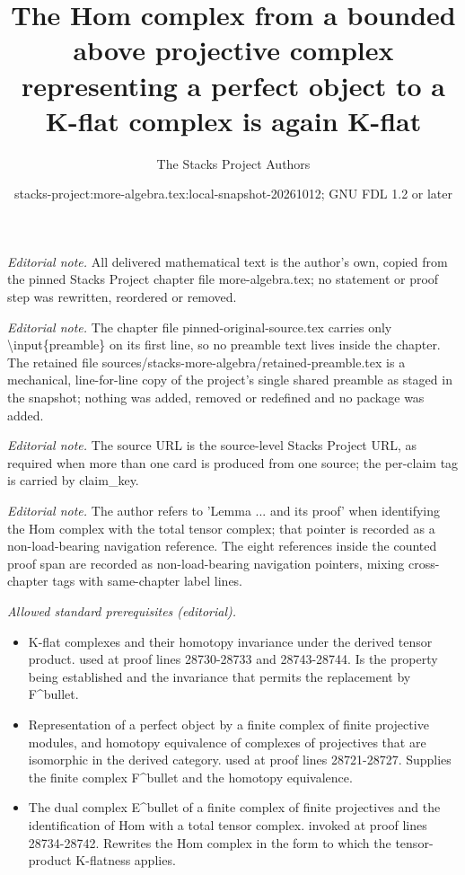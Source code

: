 \documentclass[10pt,a4paper]{amsart}
\title{The Hom complex from a bounded above projective complex representing a perfect object to a K-flat complex is again K-flat}
\author{The Stacks Project Authors}
\date{stacks-project:more-algebra.tex:local-snapshot-20261012; GNU FDL 1.2 or later}
\theoremstyle{plain}
\theoremstyle{definition}
\theoremstyle{remark}
\numberwithin{equation}{subsection}
\begin{document}
\maketitle
\setcounter{subsection}{1}
\noindent\textit{Editorial note.} All delivered mathematical text is the author's own, copied from the pinned Stacks Project chapter file more-algebra.tex; no statement or proof step was rewritten, reordered or removed.\par\medskip
\noindent\textit{Editorial note.} The chapter file pinned-original-source.tex carries only \textbackslash{}input\{preamble\} on its first line, so no preamble text lives inside the chapter. The retained file sources/stacks-more-algebra/retained-preamble.tex is a mechanical, line-for-line copy of the project's single shared preamble as staged in the snapshot; nothing was added, removed or redefined and no package was added.\par\medskip
\noindent\textit{Editorial note.} The source URL is the source-level Stacks Project URL, as required when more than one card is produced from one source; the per-claim tag is carried by claim\_key.\par\medskip
\noindent\textit{Editorial note.} The author refers to 'Lemma ... and its proof' when identifying the Hom complex with the total tensor complex; that pointer is recorded as a non-load-bearing navigation reference. The eight references inside the counted proof span are recorded as non-load-bearing navigation pointers, mixing cross-chapter tags with same-chapter label lines.\par\medskip
\noindent\textit{Allowed standard prerequisites (editorial).}\begin{itemize}
\item K-flat complexes and their homotopy invariance under the derived tensor product. used at proof lines 28730-28733 and 28743-28744. Is the property being established and the invariance that permits the replacement by F\textasciicircum{}bullet.
\item Representation of a perfect object by a finite complex of finite projective modules, and homotopy equivalence of complexes of projectives that are isomorphic in the derived category. used at proof lines 28721-28727. Supplies the finite complex F\textasciicircum{}bullet and the homotopy equivalence.
\item The dual complex E\textasciicircum{}bullet of a finite complex of finite projectives and the identification of Hom with a total tensor complex. invoked at proof lines 28734-28742. Rewrites the Hom complex in the form to which the tensor-product K-flatness applies.
\end{itemize}\medskip
\end{document}
